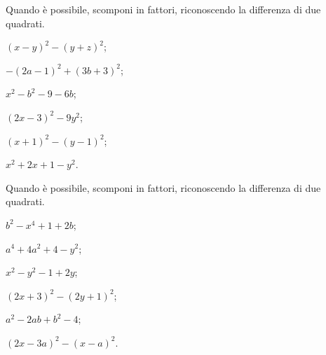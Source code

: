 \begin{esercizio}[\Ast]
\label{ese:13.53}
Quando è possibile, scomponi in fattori, riconoscendo la differenza di due quadrati.
\begin{multicols}{3}
\begin{enumeratea}
 \item $(x-y)^{2}-(y+z)^{2}$;
 \item $-(2a-1)^{2}+(3b+3)^{2}$;
 \item $x^{2}-b^{2}-9-6b$;
 \item $(2x-3)^{2}-9y^{2}$;
 \item $(x+1)^{2}-(y-1)^{2}$;
 \item $x^{2}+2x+1-y^{2}$.
\end{enumeratea}
\end{multicols}
\end{esercizio}

\begin{esercizio}[\Ast]
\label{ese:13.54}
Quando è possibile, scomponi in fattori, riconoscendo la differenza di due quadrati.
\begin{multicols}{3}
\begin{enumeratea}
 \item $b^{2}-x^{4}+1+2b$;
 \item $a^{4}+4a^{2}+4-y^{2}$;
 \item $x^{2}-y^{2}-1+2y$;
 \item $(2x+3)^{2}-(2y+1)^{2}$;
 \item $a^{2}-2{ab}+b^{2}-4$;
 \item $(2x-3a)^{2}-(x-a)^{2}$.
\end{enumeratea}
\end{multicols}
\end{esercizio}

